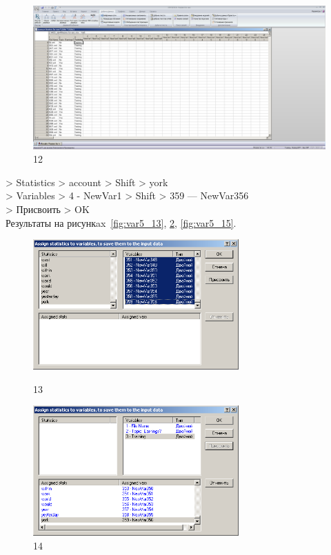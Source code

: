\begin{figure}[p!h]
  \centering

  \includegraphics[width=17cm]
  {inc/var5/12.PNG}

  \caption{12}

  \label{fig:var5_12}
\end{figure}


> Statistics > account > Shift > york \\
> Variables > 4 - NewVar1 > Shift > 359 — NewVar356 \\
> Присвоить > OK \\

Результаты на рисункax~\ref{fig:var5_13}, \ref{fig:var5_14}, \ref{fig:var5_15}.

\begin{figure}[p!h]
  \centering

  \begin{minipage}{0.49\textwidth}
    \centering

    \includegraphics[height=5cm]
    {inc/var5/13.PNG}

    \caption{13}

    \label{fig:var5_13}
  \end{minipage}
  \begin{minipage}{0.49\textwidth}
    \centering

    \includegraphics[height=5cm]
    {inc/var5/14.PNG}

    \caption{14}

    \label{fig:var5_14}
  \end{minipage}
\end{figure}


